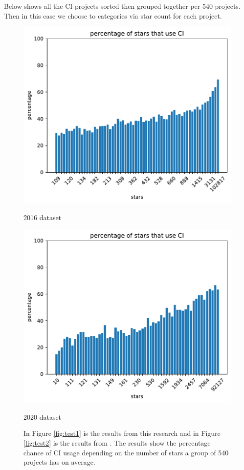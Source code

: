 \documentclass[twoside,12pt,titlepage,a4paper]{article}
\begin{document}
Below shows all the CI projects sorted then grouped together per 540 projects. Then in this case we choose to categories via star count for each project. 

\begin{figure}[!htbp]
  \centering
  \begin{minipage}{.48\textwidth}
    \centering
    \includegraphics[width=.9\textwidth]{../src/results/percentage sub with CI other paper source.pdf}
    \caption[]{2016 dataset}
    \label{fig:test2}
  \end{minipage}
  \begin{minipage}{.48\textwidth}
    \centering
    \includegraphics[width=.9\textwidth]{../src/results/percentage stars with CI.pdf}
    \caption{2020 dataset}
    \label{fig:test1}
  \end{minipage}%
  \hfill
  \caption{In Figure \ref{fig:test1} is the results from this research and in Figure \ref{fig:test2} is the results from \cite{Hilton2016}. The results show the percentage chance of CI usage depending on the number of stars a group of 540 projects has on average.}
  \label{fig:comparison_percentage_star_usage}
\end{figure}
\end{document}
